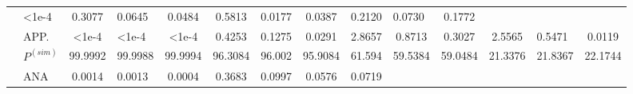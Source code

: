 \documentclass[a4paper]{IEEEtran}
\begin{document}
\begin{table}[ht!]
\begin{tabular}{|ll|ccc|ccc|ccc|ccc|}
& \cellcolor[HTML]{FFFFFF}\textless{}1e-4 
& \multicolumn{1}{c|}{\cellcolor[HTML]{FFFFFF}0.3077} 
& \multicolumn{1}{l|}{\cellcolor[HTML]{FFFFFF}0.0645} 
& \cellcolor[HTML]{FFFFFF}0.0484 
& \multicolumn{1}{c|}{\cellcolor[HTML]{FFFFFF}0.5813} 
& \multicolumn{1}{c|}{\cellcolor[HTML]{FFFFFF}0.0177} 
& \cellcolor[HTML]{FFFFFF}0.0387 
& \multicolumn{1}{c|}{\cellcolor[HTML]{FFFFFF}0.2120} 
& \multicolumn{1}{l|}{\cellcolor[HTML]{FFFFFF}0.0730} 
& \cellcolor[HTML]{FFFFFF}0.1772 \\ \cline{2-14} 
\rowcolor[HTML]{FFFFFF} 
\multicolumn{1}{|l|}{\multirow{-3}{*}{\cellcolor[HTML]{C0C0C0}(2,3)}} 
& \cellcolor[HTML]{C0C0C0}APP.                         
& \multicolumn{1}{c|}{\cellcolor[HTML]{FFFFFF}\textless{}1e-4} 
& \multicolumn{1}{l|}{\cellcolor[HTML]{FFFFFF}\textless{}1e-4} 
& \cellcolor[HTML]{FFFFFF}\textless{}1e-4 
& \multicolumn{1}{c|}{\cellcolor[HTML]{FFFFFF}0.4253} 
& \multicolumn{1}{l|}{\cellcolor[HTML]{FFFFFF}0.1275}  
& \cellcolor[HTML]{FFFFFF}0.0291 
& \multicolumn{1}{c|}{\cellcolor[HTML]{FFFFFF}2.8657} 
& \multicolumn{1}{c|}{\cellcolor[HTML]{FFFFFF}0.8713} 
& \cellcolor[HTML]{FFFFFF}0.3027 
& \multicolumn{1}{c|}{\cellcolor[HTML]{FFFFFF}2.5565} 
& \multicolumn{1}{l|}{\cellcolor[HTML]{FFFFFF}0.5471} 
& \cellcolor[HTML]{FFFFFF}0.0119 
\\ \hline
\multicolumn{1}{|l|}{\cellcolor[HTML]{C0C0C0}}                        
& \cellcolor[HTML]{C0C0C0}$P^{(sim)}$
& \multicolumn{1}{l|}{99.9992}                                 
& \multicolumn{1}{l|}{99.9988}                                 
& 99.9994                                 
& \multicolumn{1}{l|}{96.3084}                        
& \multicolumn{1}{l|}{96.002}                          
& 95.9084                        
& \multicolumn{1}{l|}{61.594}                         
& \multicolumn{1}{l|}{59.5384}                        
& \multicolumn{1}{l|}{59.0484}   
& \multicolumn{1}{l|}{21.3376}                        
& \multicolumn{1}{l|}{21.8367}                        
& 22.1744                        
\\ \cline{2-14} 
\rowcolor[HTML]{FFFFFF} 
\multicolumn{1}{|l|}{\cellcolor[HTML]{C0C0C0}}                        
& \cellcolor[HTML]{C0C0C0}ANA                          
& \multicolumn{1}{c|}{\cellcolor[HTML]{FFFFFF}0.0014}          
& \multicolumn{1}{l|}{\cellcolor[HTML]{FFFFFF}0.0013}          
& 0.0004                                  
& \multicolumn{1}{c|}{\cellcolor[HTML]{FFFFFF}0.3683} 
& \multicolumn{1}{l|}{\cellcolor[HTML]{FFFFFF}0.0997}  
& 0.0576                         
& \multicolumn{1}{c|}{\cellcolor[HTML]{FFFFFF}0.0719} 

\end{tabular}
\end{table}
\end{document}
